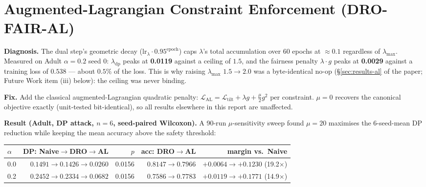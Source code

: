\documentclass[11pt,a4paper]{article}
\begin{document}
\section{Augmented-Lagrangian Constraint Enforcement (DRO-FAIR-AL)}
\label{sec:report-al}

\textbf{Diagnosis.} The dual step's geometric decay
($\mathrm{lr}_\lambda\cdot0.95^{\mathrm{epoch}}$) caps $\lambda$'s total
accumulation over 60 epochs at $\approx0.1$ regardless of $\lambda_{\max}$.
Measured on Adult $\alpha{=}0.2$ seed 0: $\lambda_{\mathrm{dp}}$ peaks at
\textbf{0.0119} against a ceiling of $1.5$, and the fairness penalty
$\lambda\cdot g$ peaks at \textbf{0.0029} against a training loss of
$0.538$ --- about $0.5\%$ of the loss. This is why raising $\lambda_{\max}$
$1.5\to2.0$ was a byte-identical no-op (\S\ref{sec:results-al} of the paper;
Future Work item (iii) below): the ceiling was never binding.

\textbf{Fix.} Add the classical augmented-Lagrangian quadratic penalty:
$\mathcal{L}_{\mathrm{AL}} = \mathcal{L}_{\mathrm{tilt}} + \lambda g +
\tfrac{\mu}{2}g^2$ per constraint. $\mu{=}0$ recovers the canonical
objective exactly (unit-tested bit-identical), so all results elsewhere in
this report are unaffected.

\textbf{Result (Adult, DP attack, $n{=}6$, seed-paired Wilcoxon).} A
90-run $\mu$-sensitivity sweep found $\mu{=}20$ maximises the 6-seed-mean DP
reduction while keeping the mean accuracy above the safety threshold:

\begin{center}
\begin{tabular}{lrrrr}
\toprule
$\alpha$ & DP: Naive$\to$DRO$\to$AL & $p$ & acc: DRO$\to$AL & margin vs.\ Naive \\
\midrule
0.0 & $0.1491\to0.1426\to\mathbf{0.0260}$ & 0.0156 & $0.8147\to0.7966$ & $+0.0064\to\mathbf{+0.1230}$ (19.2$\times$) \\
0.2 & $0.2452\to0.2334\to\mathbf{0.0682}$ & 0.0156 & $0.7586\to0.7783$ & $+0.0119\to\mathbf{+0.1771}$ (14.9$\times$) \\
\bottomrule
\end{tabular}
\end{center}
\end{document}
